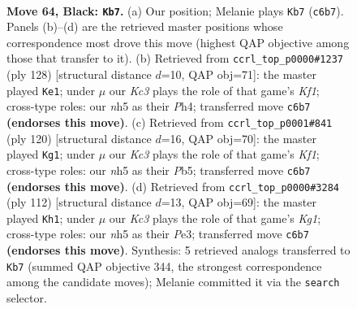 \documentclass[11pt]{article}
\begin{document}
\clearpage

\begin{figure}[p]\centering
\begin{subfigure}{0.46\textwidth}\centering
\resizebox{\linewidth}{!}{%
\newchessgame
\chessboard[
  setfen={8/8/2k1r3/RP5N/5p2/8/6P1/1K6 b - - 0 64},
  showmover=false,
  pgfstyle=straightmove, color=movearrow, markmove={c6-b7}
]}
\caption{}
\end{subfigure}\hfill
\begin{subfigure}{0.46\textwidth}\centering
\resizebox{\linewidth}{!}{%
\newchessgame
\chessboard[
  setfen={8/4r3/1k6/5R1p/7P/6P1/4p3/5K2 w - - 0 65},
  showmover=false,
  pgfstyle=straightmove, color=movearrow, markmove={f1-e1}
]}
\caption{}
\end{subfigure}
\\[4pt]
\begin{subfigure}{0.46\textwidth}\centering
\resizebox{\linewidth}{!}{%
\newchessgame
\chessboard[
  setfen={8/6k1/8/1P3R2/8/8/2r3p1/5K2 w - - 0 61},
  showmover=false,
  pgfstyle=straightmove, color=movearrow, markmove={f1-g1}
]}
\caption{}
\end{subfigure}\hfill
\begin{subfigure}{0.46\textwidth}\centering
\resizebox{\linewidth}{!}{%
\newchessgame
\chessboard[
  setfen={8/8/6R1/8/7k/4P3/r6p/6K1 w - - 0 57},
  showmover=false,
  pgfstyle=straightmove, color=movearrow, markmove={g1-h1}
]}
\caption{}
\end{subfigure}
\caption{\textbf{Move 64, Black: \texttt{Kb7}.} (a) Our position; Melanie plays \texttt{Kb7} (\texttt{c6b7}). Panels (b)--(d) are the retrieved master positions whose correspondence most drove this move (highest QAP objective among those that transfer to it). (b) Retrieved from \texttt{ccrl\_top\_p0000\#1237} (ply 128) [structural distance $d$=10, QAP obj=71]: the master played \texttt{Ke1}; under $\mu$ our \emph{Kc3} plays the role of that game's \emph{Kf1}; cross-type roles: our \emph{n}h5 as their \emph{P}h4; transferred move \texttt{c6b7} \textbf{(endorses this move)}. (c) Retrieved from \texttt{ccrl\_top\_p0001\#841} (ply 120) [structural distance $d$=16, QAP obj=70]: the master played \texttt{Kg1}; under $\mu$ our \emph{Kc3} plays the role of that game's \emph{Kf1}; cross-type roles: our \emph{n}h5 as their \emph{P}b5; transferred move \texttt{c6b7} \textbf{(endorses this move)}. (d) Retrieved from \texttt{ccrl\_top\_p0000\#3284} (ply 112) [structural distance $d$=13, QAP obj=69]: the master played \texttt{Kh1}; under $\mu$ our \emph{Kc3} plays the role of that game's \emph{Kg1}; cross-type roles: our \emph{n}h5 as their \emph{P}e3; transferred move \texttt{c6b7} \textbf{(endorses this move)}. Synthesis: 5 retrieved analogs transferred to \texttt{Kb7} (summed QAP objective 344, the strongest correspondence among the candidate moves); Melanie committed it via the \texttt{search} selector.}
\label{fig:thought-m127}
\end{figure}
\end{document}
